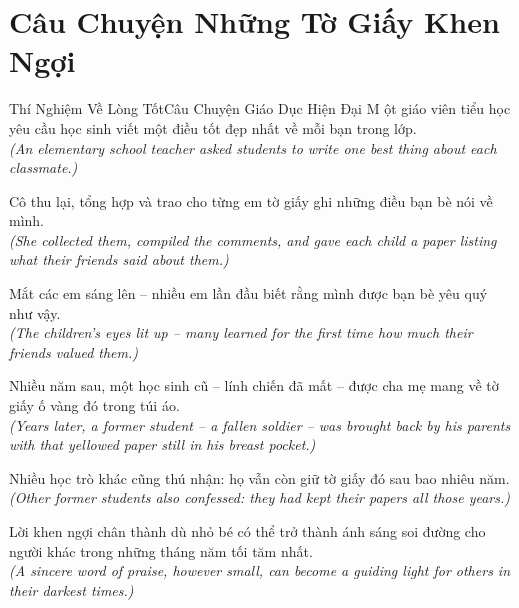 \section{Câu Chuyện Những Tờ Giấy Khen Ngợi}
\begin{truyen}{Thí Nghiệm Về Lòng Tốt}{Câu Chuyện Giáo Dục Hiện Đại}
M ột giáo viên tiểu học yêu cầu học sinh viết một điều tốt đẹp nhất về mỗi bạn trong lớp.\\
\textit{(An elementary school teacher asked students to write one best thing about each classmate.)}

Cô thu lại, tổng hợp và trao cho từng em tờ giấy ghi những điều bạn bè nói về mình.\\
\textit{(She collected them, compiled the comments, and gave each child a paper listing what their friends said about them.)}

Mắt các em sáng lên -- nhiều em lần đầu biết rằng mình được bạn bè yêu quý như vậy.\\
\textit{(The children's eyes lit up -- many learned for the first time how much their friends valued them.)}

Nhiều năm sau, một học sinh cũ -- lính chiến đã mất -- được cha mẹ mang về tờ giấy ố vàng đó trong túi áo.\\
\textit{(Years later, a former student -- a fallen soldier -- was brought back by his parents with that yellowed paper still in his breast pocket.)}

Nhiều học trò khác cũng thú nhận: họ vẫn còn giữ tờ giấy đó sau bao nhiêu năm.\\
\textit{(Other former students also confessed: they had kept their papers all those years.)}

\end{truyen}
\begin{baihoc}
  Lời khen ngợi chân thành dù nhỏ bé có thể trở thành ánh sáng soi đường cho người khác trong những tháng năm tối tăm nhất.\\
  \textit{(A sincere word of praise, however small, can become a guiding light for others in their darkest times.)}
\end{baihoc}

